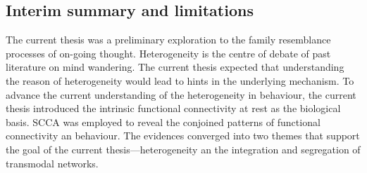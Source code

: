 
 
\subsection{Interim summary and limitations}

The current thesis was a preliminary exploration to the family resemblance processes of on-going thought. Heterogeneity is the centre of debate of past literature on mind wandering. The current thesis expected that understanding the reason of heterogeneity would lead to hints in the underlying mechanism. To advance the current understanding of the heterogeneity in behaviour, the current thesis introduced the intrinsic functional connectivity at rest as the biological basis. SCCA was employed to reveal the conjoined patterns of functional connectivity an behaviour. The evidences converged into two themes that support the goal of the current thesis---heterogeneity an the integration and segregation of transmodal networks. 

